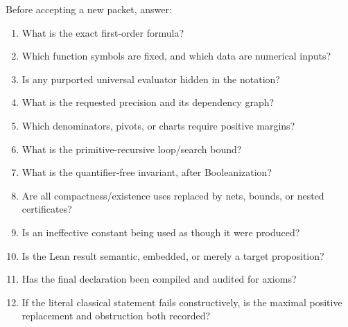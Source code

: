 Before accepting a new packet, answer:
\begin{enumerate}
\item What is the exact first-order formula?
\item Which function symbols are fixed, and which data are numerical inputs?
\item Is any purported universal evaluator hidden in the notation?
\item What is the requested precision and its dependency graph?
\item Which denominators, pivots, or charts require positive margins?
\item What is the primitive-recursive loop/search bound?
\item What is the quantifier-free invariant, after Booleanization?
\item Are all compactness/existence uses replaced by nets, bounds, or nested
      certificates?
\item Is an ineffective constant being used as though it were produced?
\item Is the Lean result semantic, embedded, or merely a target proposition?
\item Has the final declaration been compiled and audited for axioms?
\item If the literal classical statement fails constructively, is the maximal
      positive replacement and obstruction both recorded?
\end{enumerate}
